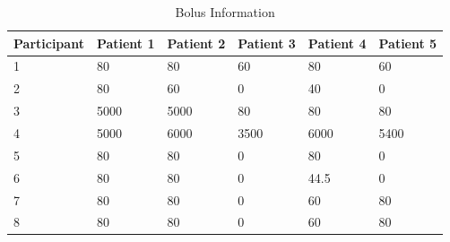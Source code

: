 \documentclass[12pt,a4paper,]{report}
\begin{document}
\begin{table}[H]
\centering
\caption{Bolus Information}
\label{my-label}
\begin{tabular}{|l|lllll|}
\hline
Participant & Patient 1 & Patient 2 & Patient 3 & Patient 4 & Patient 5 \\ \hline
1 & 80 & 80 & 60 & 80 & 60 \\
2 & 80 & 60 & 0 & 40 & 0 \\
3 & 5000 & 5000 & 80 & 80 & 80 \\
4 & 5000 & 6000 & 3500 & 6000 & 5400 \\
5 & 80 & 80 & 0 & 80 & 0 \\
6 & 80 & 80 & 0 & 44.5 & 0 \\
7 & 80 & 80 & 0 & 60 & 80 \\
8 & 80 & 80 & 0 & 60 & 80 \\ \hline
\end{tabular}
\end{table}
\end{document}
